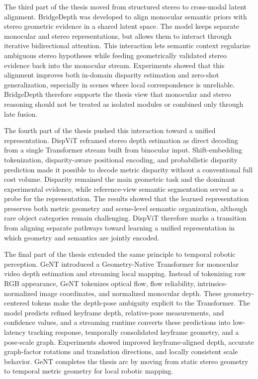 The third part of the thesis moved from structured stereo to cross-modal latent alignment.
BridgeDepth was developed to align monocular semantic priors with stereo geometric evidence in a shared latent space.
The model keeps separate monocular and stereo representations, but allows them to interact through iterative bidirectional attention.
This interaction lets semantic context regularize ambiguous stereo hypotheses while feeding geometrically validated stereo evidence back into the monocular stream.
Experiments showed that this alignment improves both in-domain disparity estimation and zero-shot generalization, especially in scenes where local correspondence is unreliable.
BridgeDepth therefore supports the thesis view that monocular and stereo reasoning should not be treated as isolated modules or combined only through late fusion.

The fourth part of the thesis pushed this interaction toward a unified representation.
DispViT reframed stereo depth estimation as direct decoding from a single Transformer stream built from binocular input.
Shift-embedding tokenization, disparity-aware positional encoding, and probabilistic disparity prediction made it possible to decode metric disparity without a conventional full cost volume.
Disparity remained the main geometric task and the dominant experimental evidence, while reference-view semantic segmentation served as a probe for the representation.
The results showed that the learned representation preserves both metric geometry and scene-level semantic organization, although rare object categories remain challenging.
DispViT therefore marks a transition from aligning separate pathways toward learning a unified representation in which geometry and semantics are jointly encoded.

The final part of the thesis extended the same principle to temporal robotic perception.
GeNT introduced a Geometry-Native Transformer for monocular video depth estimation and streaming local mapping.
Instead of tokenizing raw RGB appearance, GeNT tokenizes optical flow, flow reliability, intrinsics-normalized image coordinates, and normalized monocular depth.
These geometry-centered tokens make the depth-pose ambiguity explicit to the Transformer.
The model predicts refined keyframe depth, relative-pose measurements, and confidence values, and a streaming runtime converts these predictions into low-latency tracking response, temporally consolidated keyframe geometry, and a pose-scale graph.
Experiments showed improved keyframe-aligned depth, accurate graph-factor rotations and translation directions, and locally consistent scale behavior.
GeNT completes the thesis arc by moving from static stereo geometry to temporal metric geometry for local robotic mapping.

